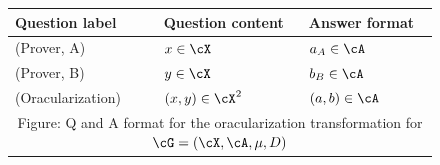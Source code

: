 

\begin{figure}[!b]
	\centering
	\small
	\begin{gamespec}
		\setlength{\tabcolsep}{1em}
		\begin{tabularx}{\textwidth}{ l   l   X   }
			\toprule
			Question label & Question content & Answer format \\
			\midrule
			(Prover, A)&  $x \in \cX$& $a_A \in \cA$\\
			(Prover, B)&  $y \in \cX$& $b_B \in \cA$\\
			(Oracularization) & $(x,y) \in \cX^2$ & $(a,b) \in \cA$ \\
			\bottomrule
			\multicolumn{3}{c}{Figure: Q and A format for the oracularization transformation for $\cG = (\cX, \cA, \mu, D)$ }
		\end{tabularx}
		

\end{gamespec}
\end{figure}
